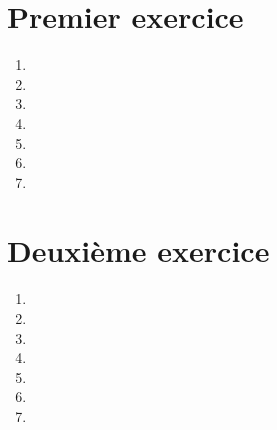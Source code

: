 \documentclass[a4paper,td]{insa}
\begin{document}
	\maketitle
	\tableofcontents
	
	\section{Premier exercice}
	
	\begin{enumerate}
		\item \lipsum[1]
		\item \lipsum[1]
		\item \lipsum[1]
		\item \lipsum[1]
		\item \lipsum[1]
		\item \lipsum[1]
		\item \lipsum[1]
	\end{enumerate}
	
	\section{Deuxième exercice}
	
	\begin{enumerate}
		\item \lipsum[1]
		\item \lipsum[1]
		\item \lipsum[1]
		\item \lipsum[1]
		\item \lipsum[1]
		\item \lipsum[1]
		\item \lipsum[1]
	\end{enumerate}
\end{document}
